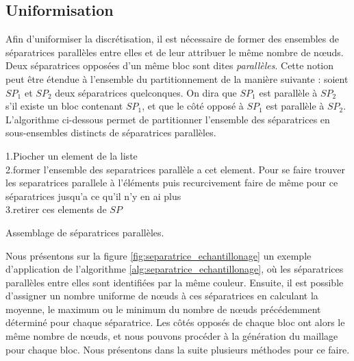 \subsection{Uniformisation}

Afin d'uniformiser la discrétisation, il est nécessaire de former des ensembles de séparatrices parallèles entre elles et de leur attribuer le même nombre de nœuds. Deux séparatrices opposées d'un même bloc sont dites \emph{parallèles}. Cette notion peut être étendue à l'ensemble du partitionnement de la manière suivante : soient $SP_1$ et $SP_2$ deux séparatrices quelconques. On dira que $SP_1$ est parallèle à $SP_2$ s'il existe un bloc contenant $SP_1$, et que le côté opposé à $SP_1$ est parallèle à $SP_2$. L'algorithme ci-dessous permet de partitionner l'ensemble des séparatrices en sous-ensembles distincts de séparatrices parallèles.

\vspace{0.5cm}
\begin{algorithm}[H]
\label{alg:separatrice_echantillonage}
\renewcommand{\algorithmcfname}{Algorithme}%
\SetAlgoLined
{}
\vspace{0.2cm}
{
\vspace{0.2cm}
1.\quad Piocher un element de la liste\\[0.2cm]
2.\quad former l'ensemble des separatrices parallèle a cet element. Pour se faire trouver les separatrices parallele à l'éléments puis recurcivement faire de même pour ce séparatrices jusqu'a ce qu'il n'y en ai plus\\[0.2cm]
3.\quad retirer ces elements de $SP$\\[0.2cm]
}
\vspace{0.2cm}
\caption{Assemblage de séparatrices parallèles.}
\end{algorithm}
\vspace{0.5cm}

Nous présentons sur la figure \ref{fig:separatrice_echantillonage} un exemple d'application de l'algorithme \ref{alg:separatrice_echantillonage}, où les séparatrices parallèles entre elles sont identifiées par la même couleur. Ensuite, il est possible d'assigner un nombre uniforme de nœuds à ces séparatrices en calculant la moyenne, le maximum ou le minimum du nombre de nœuds précédemment déterminé pour chaque séparatrice. Les côtés opposés de chaque bloc ont alors le même nombre de nœuds, et nous pouvons procéder à la génération du maillage pour chaque bloc. Nous présentons dans la suite plusieurs méthodes pour ce faire.

